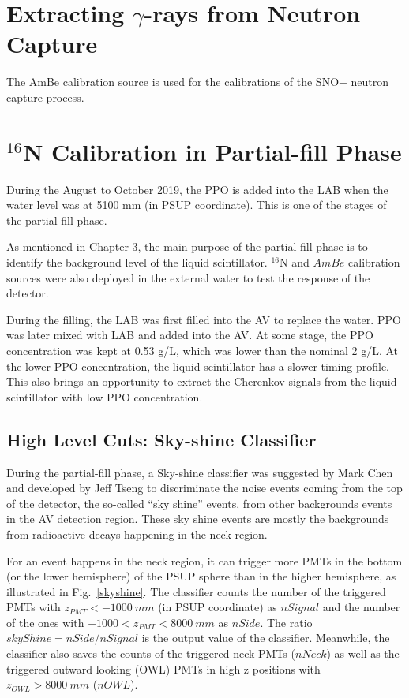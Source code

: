 \section{Extracting \texorpdfstring{$\gamma$}{Lg}-rays from Neutron Capture}
The AmBe calibration source is used for the calibrations of the SNO+ neutron capture process.


\section{$^{16}$N Calibration in Partial-fill Phase}

During the August to October 2019, the PPO is added into the LAB when the water level was at 5100 mm (in PSUP coordinate). This is one of the stages of the partial-fill phase.

As mentioned in Chapter 3, the main purpose of the partial-fill phase is to identify the background level of the liquid scintillator. $^{16}$N and $AmBe$ calibration sources were also deployed in the external water to test the response of the detector. 

During the filling, the LAB was first filled into the AV to replace the water. PPO was later mixed with LAB and added into the AV. At some stage, the PPO concentration was kept at 0.53 g/L, which was lower than the nominal 2 g/L. At the lower PPO concentration, the liquid scintillator has a slower timing profile. This also brings an opportunity to extract the Cherenkov signals from the liquid scintillator with low PPO concentration.

\subsection{High Level Cuts: Sky-shine Classifier}
During the partial-fill phase, a Sky-shine classifier was suggested by Mark Chen and developed by Jeff Tseng to discriminate the noise events coming from the top of the detector, the so-called ``sky shine'' events, from other backgrounds events in the AV detection region\cite{skyshine}. These sky shine events are mostly the backgrounds from radioactive decays happening in the neck region. 

For an event happens in the neck region, it can trigger more PMTs in the bottom (or 
the lower hemisphere) of the PSUP sphere than in the higher hemisphere, as illustrated in Fig.~\ref{skyshine}. The classifier counts the number of the triggered PMTs with $z_{PMT}<-1000~mm$ (in PSUP coordinate) as $nSignal$ and the number of the ones with $-1000<z_{PMT}<8000~mm$ as $nSide$. The ratio $skyShine=nSide/nSignal$ is the output value of the classifier. Meanwhile, the classifier also saves the counts of the triggered neck PMTs ($nNeck$) as well as the triggered outward looking (OWL) PMTs in high z positions with $z_{OWL}>8000~mm$ ($nOWL$).

